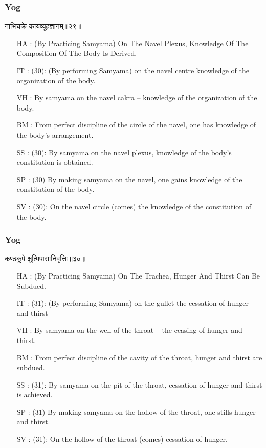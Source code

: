 \begin{frame}[fragile]\frametitle{Yog}
\begin{sanskrit}
नाभिचक्रे कायव्यूहज्ञानम्॥२९॥
\end{sanskrit}

	\begin{itemize}
	\item [HA]: (By Practicing Samyama) On The Navel Plexus, Knowledge Of The Composition Of The Body Is Derived.
	\item [IT]: (30): (By performing Samyama) on the navel centre knowledge of the organization of the body.
	\item [VH]: By samyama on the navel cakra – knowledge of the organization of the body.
	\item [BM]: From perfect discipline of the circle of the navel, one has knowledge of the body’s arrangement.
	\item [SS]: (30): By samyama on the navel plexus, knowledge of the body’s constitution is obtained.
	\item [SP]: (30) By making samyama on the navel, one gains knowledge of the constitution of the body.
	\item [SV]: (30): On the navel circle (comes) the knowledge of the constitution of the body. 
	\end{itemize}
\end{frame}

\begin{frame}[fragile]\frametitle{Yog}
\begin{sanskrit}
कण्ठकूपे क्षुत्पिपासानिवृत्तिः॥३०॥
\end{sanskrit}

	\begin{itemize}
	\item [HA]: (By Practicing Samyama) On The Trachea, Hunger And Thirst Can Be Subdued.
	\item [IT]: (31): (By performing Samyama) on the gullet the cessation of hunger and thirst
	\item [VH]: By samyama on the well of the throat – the ceasing of hunger and thirst.
	\item [BM]: From perfect discipline of the cavity of the throat, hunger and thirst are subdued.
	\item [SS]: (31): By samyama on the pit of the throat, cessation of hunger and thirst is achieved.
	\item [SP]: (31) By making samyama on the hollow of the throat, one stills hunger and thirst.
	\item [SV]: (31): On the hollow of the throat (comes) cessation of hunger. 
	\end{itemize}
\end{frame}


